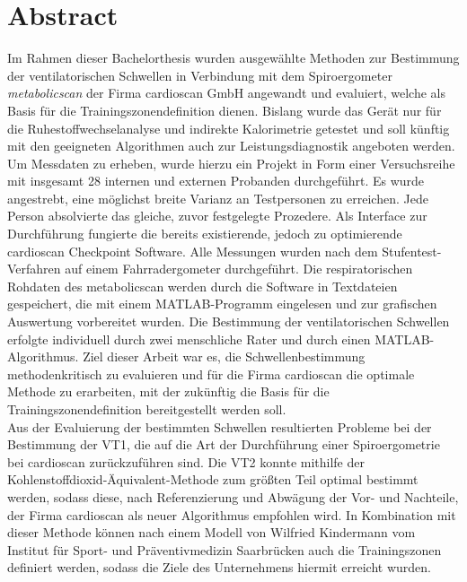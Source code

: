\chapter*{Abstract}

Im Rahmen dieser Bachelorthesis wurden ausgewählte Methoden zur Bestimmung der ventilatorischen Schwellen in Verbindung mit dem Spiroergometer \textsl{metabolicscan} der Firma cardioscan GmbH angewandt und evaluiert, welche als Basis für die Trainingszonendefinition dienen. Bislang wurde das Gerät nur für die Ruhestoffwechselanalyse und indirekte Kalorimetrie getestet und soll künftig mit den geeigneten Algorithmen auch zur Leistungsdiagnostik angeboten werden. Um Messdaten zu erheben, wurde hierzu ein Projekt in Form einer Versuchsreihe mit insgesamt 28 internen und externen Probanden durchgeführt. Es wurde angestrebt, eine möglichst breite Varianz an Testpersonen zu erreichen. Jede Person absolvierte das gleiche, zuvor festgelegte Prozedere. Als Interface zur Durchführung fungierte die bereits existierende, jedoch zu optimierende cardioscan Checkpoint Software. Alle Messungen wurden nach dem Stufentest-Verfahren auf einem Fahrradergometer durchgeführt. Die respiratorischen Rohdaten des metabolicscan werden durch die Software in Textdateien gespeichert, die mit einem MATLAB-Programm eingelesen und zur grafischen Auswertung vorbereitet wurden. Die Bestimmung der ventilatorischen Schwellen erfolgte individuell durch zwei menschliche Rater und durch einen MATLAB-Algorithmus. Ziel dieser Arbeit war es, die Schwellenbestimmung methodenkritisch zu evaluieren und für die Firma cardioscan die optimale Methode zu erarbeiten, mit der zukünftig die Basis für die Trainingszonendefinition bereitgestellt werden soll.\\
Aus der Evaluierung der bestimmten Schwellen resultierten Probleme bei der Bestimmung der VT1, die auf die Art der Durchführung einer Spiroergometrie bei cardioscan zurückzuführen sind. Die VT2 konnte mithilfe der Kohlenstoffdioxid-Äquivalent-Methode zum größten Teil optimal bestimmt werden, sodass diese, nach Referenzierung und Abwägung der Vor- und Nachteile, der Firma cardioscan als neuer Algorithmus empfohlen wird. In Kombination mit dieser Methode können nach einem Modell von Wilfried Kindermann vom Institut für Sport- und Präventivmedizin Saarbrücken auch die Trainingszonen definiert werden, sodass die Ziele des Unternehmens hiermit erreicht wurden.
